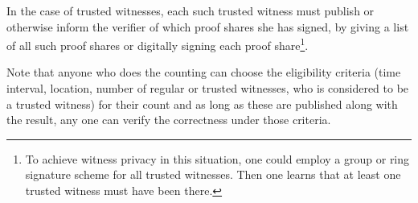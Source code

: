In the case of trusted witnesses, each such trusted witness must
publish or otherwise inform the 
verifier of which proof shares she has signed, \eg by giving a list 
of all such proof shares or digitally signing each proof share\footnote{
 To achieve witness privacy in this situation, one could employ a group or 
 ring signature scheme for all trusted witnesses.
 Then one learns that at least one trusted witness must have been there.
}.

Note that anyone who does the counting can choose the eligibility
criteria (time interval, location, number of regular or trusted
witnesses, who is considered to be a trusted witness) for their count
and as long as these are published along with the result, any one can
verify the correctness under those criteria.

